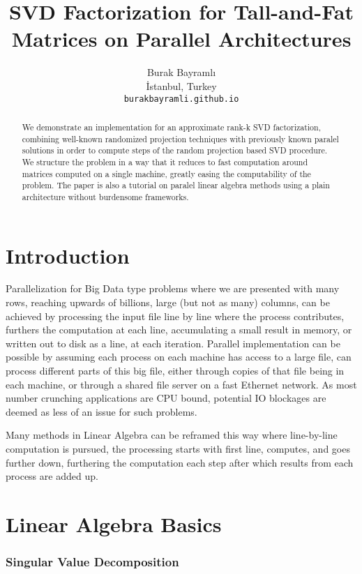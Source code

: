 \documentclass{article}
\title{SVD Factorization for Tall-and-Fat Matrices on Parallel Architectures}
\author{
  Burak Bayramlı \\
  İstanbul, Turkey\\
  \texttt{burakbayramli.github.io} 
}
\begin{document}
\maketitle

\begin{abstract}
We demonstrate an implementation for an approximate rank-k SVD factorization,
combining well-known randomized projection techniques with previously known
paralel solutions in order to compute steps of the random projection based SVD
procedure. We structure the problem in a way that it reduces to fast computation
around  matrices computed on a single machine, greatly easing the
computability of the problem. The paper is also a tutorial on paralel linear
algebra methods using a plain architecture without burdensome frameworks.
\end{abstract}



\section{Introduction}

Parallelization for Big Data type problems where we are presented with many
rows, reaching upwards of billions, large (but not as many) columns, can be
achieved by processing the input file line by line where the process
contributes, furthers the computation at each line, accumulating a small result
in memory, or written out to disk as a line, at each iteration. Parallel
implementation can be possible by assuming each process on each machine has
access to a large file, can process different parts of this big file, either
through copies of that file being in each machine, or through a shared file
server on a fast Ethernet network. As most number crunching applications are CPU
bound, potential IO blockages are deemed as less of an issue for such problems.

Many methods in Linear Algebra can be reframed this way where line-by-line
computation is pursued, the processing starts with first line, computes, and
goes further down, furthering the computation each step after which results from
each process are added up.

\section{Linear Algebra Basics}

\subsubsection{Singular Value Decomposition}
\end{document}
